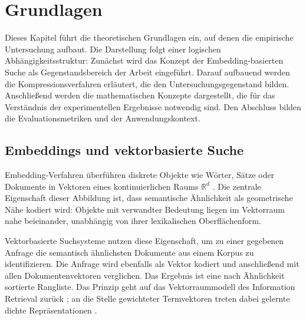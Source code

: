 \chapter{Grundlagen}
\label{chap:grundlagen}
%
Dieses Kapitel führt die theoretischen Grundlagen ein, auf denen die empirische Untersuchung aufbaut.
Die Darstellung folgt einer logischen Abhängigkeitsstruktur: Zunächst wird das Konzept der Embedding-basierten Suche als Gegenstandsbereich der Arbeit eingeführt.
Darauf aufbauend werden die Kompressionsverfahren erläutert, die den Untersuchungsgegenstand bilden.
Anschließend werden die mathematischen Konzepte dargestellt, die für das Verständnis der experimentellen Ergebnisse notwendig sind.
Den Abschluss bilden die Evaluationsmetriken und der Anwendungskontext.
%
%
\section{Embeddings und vektorbasierte Suche}
\label{sec:grundlagen_embeddings}
%
Embedding-Verfahren überführen diskrete Objekte wie Wörter, Sätze oder Dokumente in Vektoren eines kontinuierlichen Raums $\mathbb{R}^d$ \cite{mikolov_2013_word2vec,reimers_2019_sbert}.
Die zentrale Eigenschaft dieser Abbildung ist, dass semantische Ähnlichkeit als geometrische Nähe kodiert wird: Objekte mit verwandter Bedeutung liegen im Vektorraum nahe beieinander, unabhängig von ihrer lexikalischen Oberflächenform.
\par
Vektorbasierte Suchsysteme nutzen diese Eigenschaft, um zu einer gegebenen Anfrage die semantisch ähnlichsten Dokumente aus einem Korpus zu identifizieren.
Die Anfrage wird ebenfalls als Vektor kodiert und anschließend mit allen Dokumentenvektoren verglichen.
Das Ergebnis ist eine nach Ähnlichkeit sortierte Rangliste.
Das Prinzip geht auf das Vektorraummodell des Information Retrieval zurück \cite{salton_1975_vsm,manning_2008_ir}; an die Stelle gewichteter Termvektoren treten dabei gelernte dichte Repräsentationen \cite{karpukhin_2020_dpr}.
%

